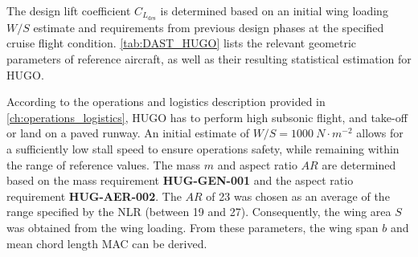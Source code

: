
The design lift coefficient $C_{L_\text{des}}$ is determined based on an initial wing loading $W/S$ estimate and requirements from previous design phases at the specified cruise flight condition. \autoref{tab:DAST_HUGO} lists the relevant geometric parameters of reference aircraft, as well as their resulting statistical estimation for HUGO.


According to the operations and logistics description provided in \autoref{ch:operations_logistics}, HUGO has to perform high subsonic flight, and take-off or land on a paved runway. An initial estimate of $W/S = 1000\  N \cdot m^{-2}$ allows for a sufficiently low stall speed to ensure operations safety, while remaining within the range of reference values.
The mass $m$ and aspect ratio $AR$ are determined based on the mass requirement \textbf{HUG-GEN-001} and the aspect ratio requirement \textbf{HUG-AER-002}. The $AR$ of 23 was chosen as an average of the range specified by the NLR (between 19 and 27).
Consequently, the wing area $S$ was obtained from the wing loading. From these parameters, the wing span $b$ and mean chord length MAC can be derived. 

